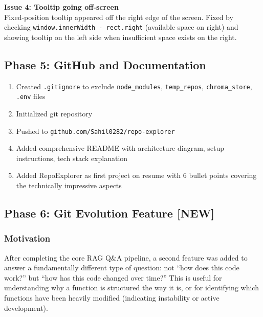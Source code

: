 \documentclass[a4paper,11pt]{article}
\begin{document}
\vspace{4pt}
\textbf{Issue 4: Tooltip going off-screen}\\
Fixed-position tooltip appeared off the right edge of the screen. Fixed by checking \texttt{window.innerWidth - rect.right} (available space on right) and showing tooltip on the left side when insufficient space exists on the right.

\subsection{Phase 5: GitHub and Documentation}

\begin{enumerate}
    \item Created \texttt{.gitignore} to exclude \texttt{node\_modules}, \texttt{temp\_repos}, \texttt{chroma\_store}, \texttt{.env} files
    \item Initialized git repository
    \item Pushed to \texttt{github.com/Sahil0282/repo-explorer}
    \item Added comprehensive README with architecture diagram, setup instructions, tech stack explanation
    \item Added RepoExplorer as first project on resume with 6 bullet points covering the technically impressive aspects
\end{enumerate}

\subsection{Phase 6: Git Evolution Feature \textbf{[NEW]}}

\subsubsection{Motivation}
After completing the core RAG Q\&A pipeline, a second feature was added to answer a fundamentally different type of question: not ``how does this code work?'' but ``how has this code changed over time?'' This is useful for understanding why a function is structured the way it is, or for identifying which functions have been heavily modified (indicating instability or active development).
\end{document}
